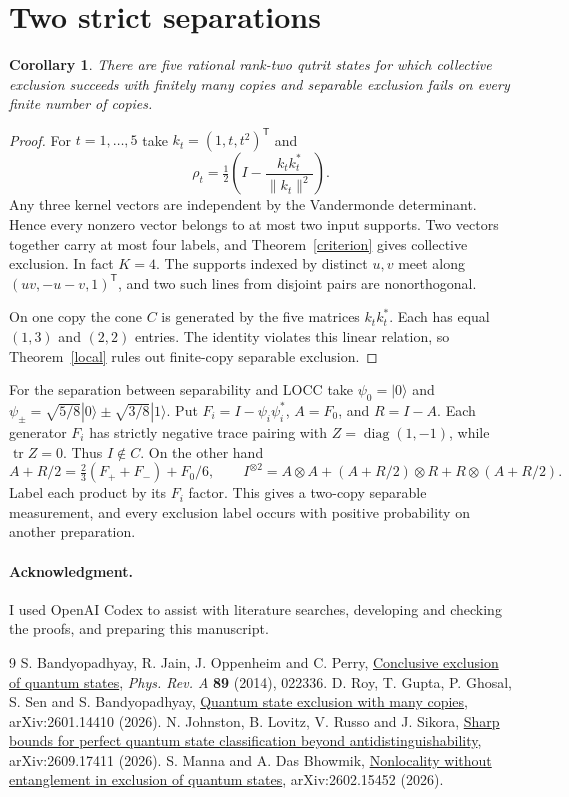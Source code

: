 \documentclass[11pt,a4paper]{article}
\newtheorem{corollary}[theorem]{Corollary}
\theoremstyle{remark}
\newcommand{\tr}{\operatorname{tr}}
\newcommand{\ack}{\paragraph*{Acknowledgment.} I used OpenAI Codex to assist with literature searches, developing and checking the proofs, and preparing this manuscript.}
\begin{document}
\section{Two strict separations}

\begin{corollary}
There are five rational rank-two qutrit states for which collective exclusion succeeds with finitely many copies and separable exclusion fails on every finite number of copies.
\end{corollary}
\begin{proof}
For \(t=1,\ldots,5\) take \(k_t=(1,t,t^2)^{\mathsf T}\) and
\[
      \rho_t=\tfrac12\left(I-\frac{k_tk_t^*}{\|k_t\|^2}\right).
\]
Any three kernel vectors are independent by the Vandermonde determinant. Hence every nonzero vector belongs to at most two input supports. Two vectors together carry at most four labels, and Theorem~\ref{criterion} gives collective exclusion. In fact \(K=4\). The supports indexed by distinct \(u,v\) meet along \((uv,-u-v,1)^{\mathsf T}\), and two such lines from disjoint pairs are nonorthogonal.

On one copy the cone \(C\) is generated by the five matrices \(k_tk_t^*\). Each has equal \((1,3)\) and \((2,2)\) entries. The identity violates this linear relation, so Theorem~\ref{local} rules out finite-copy separable exclusion.
\end{proof}

For the separation between separability and LOCC take \(\psi_0=|0\rangle\) and \(\psi_\pm=\sqrt{5/8}|0\rangle\pm\sqrt{3/8}|1\rangle\). Put \(F_i=I-\psi_i\psi_i^*\), \(A=F_0\), and \(R=I-A\). Each generator \(F_i\) has strictly negative trace pairing with \(Z=\operatorname{diag}(1,-1)\), while \(\tr Z=0\). Thus \(I\notin C\). On the other hand
\[
      A+R/2=\tfrac23(F_++F_-)+F_0/6,\qquad
      I^{\otimes2}=A\otimes A+(A+R/2)\otimes R+R\otimes(A+R/2).
\]
Label each product by its \(F_i\) factor. This gives a two-copy separable measurement, and every exclusion label occurs with positive probability on another preparation.

\ack
\begin{thebibliography}{9}
 S. Bandyopadhyay, R. Jain, J. Oppenheim and C. Perry, \href{https://doi.org/10.1103/PhysRevA.89.022336}{Conclusive exclusion of quantum states}, \emph{Phys. Rev. A} \textbf{89} (2014), 022336.
 D. Roy, T. Gupta, P. Ghosal, S. Sen and S. Bandyopadhyay, \href{https://arxiv.org/abs/2601.14410}{Quantum state exclusion with many copies}, arXiv:2601.14410 (2026).
 N. Johnston, B. Lovitz, V. Russo and J. Sikora, \href{https://arxiv.org/abs/2609.17411}{Sharp bounds for perfect quantum state classification beyond antidistinguishability}, arXiv:2609.17411 (2026).
 S. Manna and A. Das Bhowmik, \href{https://arxiv.org/abs/2602.15452}{Nonlocality without entanglement in exclusion of quantum states}, arXiv:2602.15452 (2026).
\end{thebibliography}
\end{document}
